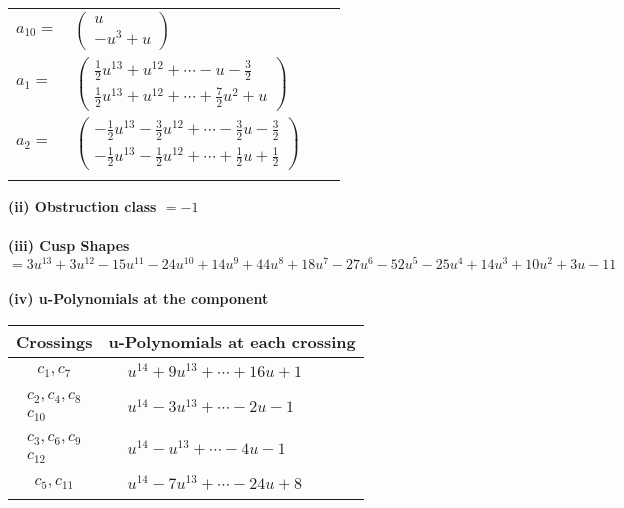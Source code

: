 \documentclass[1p]{elsarticle_modified}
\theoremstyle{definition}
\begin{document}
\begin{tabular}{m{7pt} m{180pt} m{7pt} m{180pt} }
\flushright $a_{10}=$&$\begin{pmatrix}u\\- u^3+u\end{pmatrix}$ \\
\flushright $a_{1}=$&$\begin{pmatrix}\frac{1}{2} u^{13}+u^{12}+\cdots- u-\frac{3}{2}\\\frac{1}{2} u^{13}+u^{12}+\cdots+\frac{7}{2} u^2+u\end{pmatrix}$ \\
\flushright $a_{2}=$&$\begin{pmatrix}-\frac{1}{2} u^{13}-\frac{3}{2} u^{12}+\cdots-\frac{3}{2} u-\frac{3}{2}\\-\frac{1}{2} u^{13}-\frac{1}{2} u^{12}+\cdots+\frac{1}{2} u+\frac{1}{2}\end{pmatrix}$\\&\end{tabular}
\flushleft \textbf{(ii) Obstruction class $= -1$}\\~\\
\flushleft \textbf{(iii) Cusp Shapes $= 3 u^{13}+3 u^{12}-15 u^{11}-24 u^{10}+14 u^9+44 u^8+18 u^7-27 u^6-52 u^5-25 u^4+14 u^3+10 u^2+3 u-11$}\\~\\
\newpage\renewcommand{\arraystretch}{1}
\flushleft \textbf{(iv) u-Polynomials at the component}\newline \\
\begin{tabular}{m{50pt}|m{274pt}}
Crossings & \hspace{64pt}u-Polynomials at each crossing \\
\hline $$\begin{aligned}c_{1},c_{7}\end{aligned}$$&$\begin{aligned}
&u^{14}+9 u^{13}+\cdots+16 u+1
\end{aligned}$\\
\hline $$\begin{aligned}c_{2},c_{4},c_{8}\\c_{10}\end{aligned}$$&$\begin{aligned}
&u^{14}-3 u^{13}+\cdots-2 u-1
\end{aligned}$\\
\hline $$\begin{aligned}c_{3},c_{6},c_{9}\\c_{12}\end{aligned}$$&$\begin{aligned}
&u^{14}- u^{13}+\cdots-4 u-1
\end{aligned}$\\
\hline $$\begin{aligned}c_{5},c_{11}\end{aligned}$$&$\begin{aligned}
&u^{14}-7 u^{13}+\cdots-24 u+8
\end{aligned}$\\
\hline
\end{tabular}\\~\\
\end{document}
